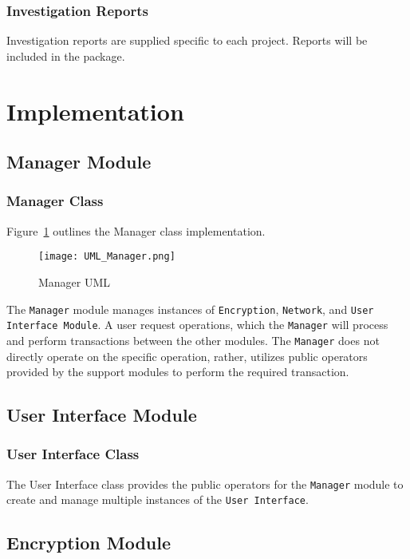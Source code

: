 \documentclass[sigconf]{acmart}
\begin{document}
\subsubsection{Investigation Reports}
Investigation reports are supplied specific to each project. Reports will be
included in the package.


\section{Implementation}

\subsection{Manager Module}
\subsubsection{Manager Class}
Figure~\ref{Manager UML} outlines the Manager class implementation.
\begin{figure}[htb]
	\begin{center}
		\texttt{[image: UML\_Manager.png]}
		\caption{Manager UML}
		\label{Manager UML}
	\end{center}
\end{figure}
The \texttt{Manager} module manages instances of \texttt{Encryption},
\texttt{Network}, and \texttt{User Interface Module}. A user request
operations, which the \texttt{Manager} will process and perform transactions
between the other modules. The \texttt{Manager} does not directly
operate on the specific operation, rather, utilizes public operators provided
by the support modules to perform the required transaction.

\subsection{User Interface Module}
\subsubsection{User Interface Class}
The User Interface class provides the public operators for the \texttt{Manager} module to create
and manage multiple instances of the \texttt{User Interface}.

\subsection{Encryption Module}
\end{document}
